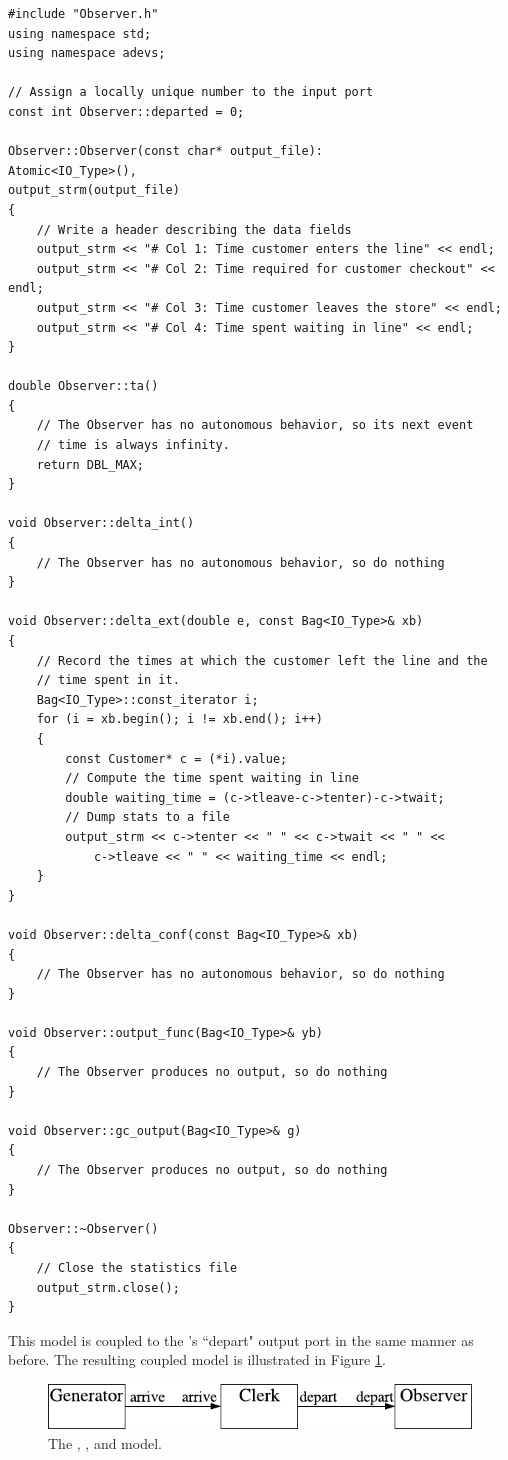 \begin{verbatim}
#include "Observer.h"
using namespace std;
using namespace adevs;

// Assign a locally unique number to the input port
const int Observer::departed = 0;

Observer::Observer(const char* output_file):
Atomic<IO_Type>(),
output_strm(output_file)
{
    // Write a header describing the data fields
    output_strm << "# Col 1: Time customer enters the line" << endl;
    output_strm << "# Col 2: Time required for customer checkout" << endl;
    output_strm << "# Col 3: Time customer leaves the store" << endl;
    output_strm << "# Col 4: Time spent waiting in line" << endl;
}

double Observer::ta()
{
    // The Observer has no autonomous behavior, so its next event
    // time is always infinity.
    return DBL_MAX;
}

void Observer::delta_int()
{
    // The Observer has no autonomous behavior, so do nothing
}

void Observer::delta_ext(double e, const Bag<IO_Type>& xb)
{
    // Record the times at which the customer left the line and the
    // time spent in it.
    Bag<IO_Type>::const_iterator i;
    for (i = xb.begin(); i != xb.end(); i++)
    {
        const Customer* c = (*i).value;
        // Compute the time spent waiting in line
        double waiting_time = (c->tleave-c->tenter)-c->twait;
        // Dump stats to a file
        output_strm << c->tenter << " " << c->twait << " " <<
            c->tleave << " " << waiting_time << endl;
    }
}

void Observer::delta_conf(const Bag<IO_Type>& xb)
{
    // The Observer has no autonomous behavior, so do nothing
}

void Observer::output_func(Bag<IO_Type>& yb)
{
    // The Observer produces no output, so do nothing
}

void Observer::gc_output(Bag<IO_Type>& g)
{
    // The Observer produces no output, so do nothing
}

Observer::~Observer()
{
    // Close the statistics file
    output_strm.close();
}
\end{verbatim}

This model is coupled to the 's ``depart" output port in the same manner as before. The resulting coupled model is illustrated in Figure \ref{fig:complete_store_model}.
\begin{figure}[ht]
\centering
\includegraphics{intro_figs/generator_and_clerk_and_observer.pdf}
\caption{The , , and  model.}
\label{fig:complete_store_model}
\end{figure}

